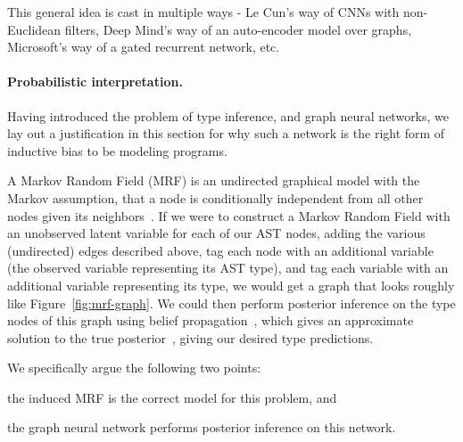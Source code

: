 This general idea is cast in multiple ways - Le Cun's way of CNNs with non-Euclidean filters, Deep Mind's way of an auto-encoder model over graphs, Microsoft's way of a gated recurrent network, etc.


\paragraph{Probabilistic interpretation.}
Having introduced the problem of type inference, and graph neural networks, we lay out a justification in this section for why such a network is the right form of inductive bias to be modeling programs.

A Markov Random Field (MRF) is an undirected graphical model with the Markov assumption, that a node is conditionally independent from all other nodes given its neighbors~\cite{kinderman80markov}.
If we were to construct a Markov Random Field with an unobserved latent variable for each of our AST nodes, adding the various (undirected) edges described above, tag each node with an additional variable (the observed variable representing its AST type), and tag each variable with an additional variable representing its type, we would get a graph that looks roughly like Figure~\ref{fig:mrf-graph}.
We could then perform posterior inference on the type nodes of this graph using belief propagation~\cite{pearl2009causality}, which gives an approximate solution to the true posterior~\cite{weiss2000correctness}, giving our desired type predictions.

We specifically argue the following two points:
\begin{enumerate*}[label=(\roman*)]
	\item the induced MRF is the correct model for this problem, and
	\item the graph neural network performs posterior inference on this network.
\end{enumerate*}


